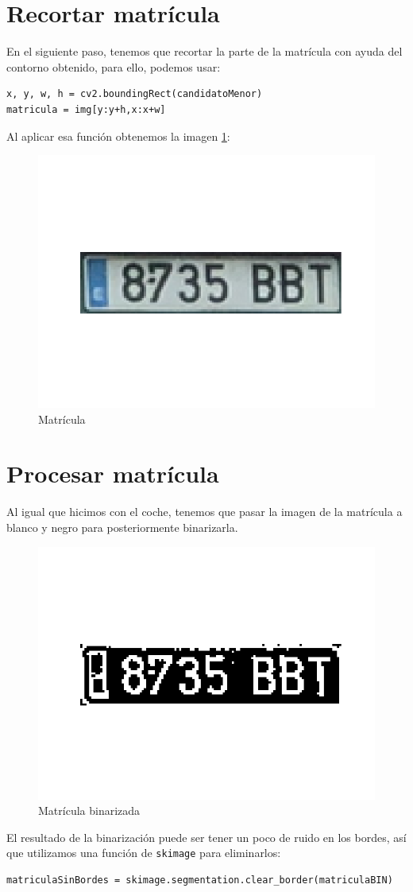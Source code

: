 \section{Recortar matrícula}
En el siguiente paso, tenemos que recortar la parte de la matrícula con ayuda del contorno obtenido, para ello, podemos usar:
\begin{verbatim}
x, y, w, h = cv2.boundingRect(candidatoMenor)
matricula = img[y:y+h,x:x+w]
\end{verbatim}
Al aplicar esa función obtenemos la imagen \ref{coche1Matricula}:
\begin{figure}[H]
    \centering
    \includegraphics[width=.4\linewidth]{Images/coche1Matricula.png}
    \caption{Matrícula}
    \label{coche1Matricula}
\end{figure}

\section{Procesar matrícula}
Al igual que hicimos con el coche, tenemos que pasar la imagen de la matrícula a blanco y negro para posteriormente binarizarla.
\begin{figure}[H]
    \centering
    \includegraphics[width=.4\linewidth]{Images/coche1MatriculaUmbral.png}
    \caption{Matrícula binarizada}
    \label{coche1MatriculaUmbral}
\end{figure}

El resultado de la binarización puede ser tener un poco de ruido en los bordes, así que utilizamos una función de \texttt{skimage} para eliminarlos:
\begin{verbatim}
matriculaSinBordes = skimage.segmentation.clear_border(matriculaBIN)
\end{verbatim}

